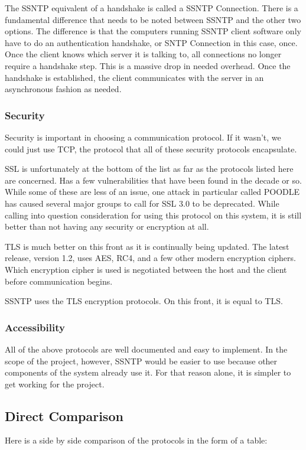 \documentclass[10pt,letterpaper,onecolumn,draftclsnofoot]{IEEEtran}
\begin{document}
The SSNTP equivalent of a handshake is called a SSNTP Connection. There is a
fundamental difference that needs to be noted between SSNTP and the other two
options. The difference is that the computers running SSNTP client software
only have to do an authentication handshake, or SNTP Connection in this case,
once. Once the client knows which server it is talking to, all connections
no longer require a handshake step. This is a massive drop in needed overhead.
\cite{ssntp} Once the handshake is established, the client communicates with
the server in an asynchronous fashion as needed.

\subsubsection{Security}
Security is important in choosing a communication protocol. If it wasn't, we
could just use TCP, the protocol that all of these security protocols
encapsulate.

SSL is unfortunately at the bottom of the list as far as the
protocols listed here are concerned. Has a few vulnerabilities that have been
found in the decade or so. While some of these are less of an issue, one attack
in particular called POODLE has caused several major groups to call for SSL 3.0
to be deprecated.\cite{poodle} While calling into question consideration for
using this protocol on this system, it is still better than not having any
security or encryption at all.

TLS is much better on this front as it is continually being updated. The latest
release, version 1.2, uses AES, RC4, and a few other modern encryption ciphers.
\cite{tls} Which encryption cipher is used is negotiated between the host and
the client before communication begins.

SSNTP uses the TLS encryption protocols. On this front, it is equal to TLS.

\subsubsection{Accessibility}
All of the above protocols are well documented and easy to implement. In the
scope of the project, however, SSNTP would be easier to use because other
components of the system already use it. For that reason alone, it is simpler
to get working for the project.

\subsection{Direct Comparison}
Here is a side by side comparison of the protocols in the form of a table:
\end{document}
